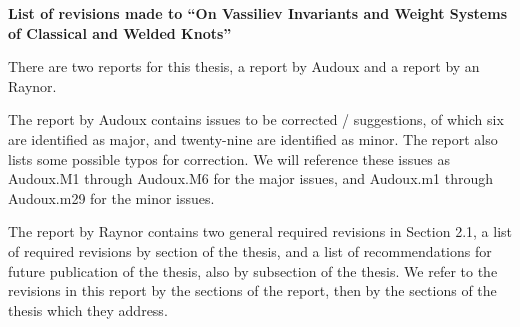 \documentclass[a4paper, 11pt]{report}
\begin{document}
\begin{center}
    \textbf{List of revisions made to ``On Vassiliev Invariants and Weight Systems of Classical and Welded Knots''}
\end{center}

\vspace{1.5cm}

There are two reports for this thesis, a report by Audoux and a report by an Raynor.

The report by Audoux contains issues to be corrected / suggestions, of which six are identified as major, and twenty-nine are identified as minor. The report also lists some possible typos for correction. We will reference these issues as Audoux.M1 through Audoux.M6 for the major issues, and Audoux.m1 through Audoux.m29 for the minor issues.

The report by Raynor contains two general required revisions in Section 2.1, a list of required revisions by section of the thesis, and a list of recommendations for future publication of the thesis, also by subsection of the thesis. We refer to the revisions in this report by the sections of the report, then by the sections of the thesis which they address.
\end{document}
